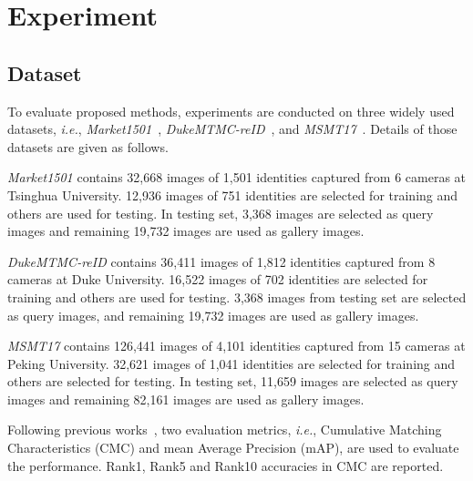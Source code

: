 \documentclass[sigconf]{acmart}
\begin{document}
\section{Experiment}

\subsection{Dataset}
To evaluate proposed methods, experiments are conducted on three widely used datasets, \textit{i.e.}, \textit{Market1501}~\cite{market}, \textit{DukeMTMC-reID}~\cite{duke}, and \textit{MSMT17}~\cite{msmt}. Details of those datasets are given as follows.

\textit{Market1501} contains 32,668 images of 1,501 identities captured from 6 cameras at Tsinghua University. 12,936 images of 751 identities are selected for training and others are used for testing. In testing set, 3,368 images are selected as query images and remaining 19,732 images are used as gallery images.

\textit{DukeMTMC-reID} contains 36,411 images of 1,812 identities captured from 8 cameras at Duke University. 16,522 images of 702 identities are selected for training and others are used for testing. 3,368 images from testing set are selected as query images, and remaining 19,732 images are used as gallery images.

\textit{MSMT17} contains 126,441 images of 4,101 identities captured from 15 cameras at Peking University. 32,621 images of 1,041 identities are selected for training and others are selected for testing. In testing set, 11,659 images are selected as query images and remaining 82,161 images are used as gallery images.

Following previous works~\cite{market, msmt, duke, zhong2019invariance}, two evaluation metrics, \textit{i.e.}, Cumulative Matching Characteristics (CMC) and mean Average Precision (mAP), are used to evaluate the performance. Rank1, Rank5 and Rank10 accuracies in CMC are reported.
\end{document}
